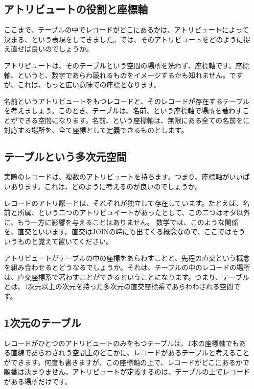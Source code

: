 \subsection{アトリビュートの役割と座標軸}

ここまで、テーブルの中でレコードがどこにあるかは、アトリビュートによって決まる、という表現をしてきました。では、そのアトリビュートをどのように捉え直せば良いのでしょうか。

アトリビュートは、そのテーブルという空間の場所を洗わず、座標軸です。座標軸、というと、数字であらわ競れるものをイメージするかも知れません。ですが、これは、もっと広い意味での座標となります。

名前というアトリビュートをもつレコードと、そのレコードが存在するテーブルを考えましょう。このとき、テーブルは、名前、という座標軸で場所を著わすことができる空間になります。名前、という座標軸は、無限にある全ての名前をに対応する場所を、全て座標として定義できるものとします。

\subsection{テーブルという多次元空間}

実際のレコードは、複数のアトリビュートを持ちます。つまり、座標軸がいいぱいあります。これは、どのように考えるのが良いのでしょうか。

レコードのアトリ謬ーとは、それぞれが独立して存在しています。たとえば、名前と所属、という二つのアトリビュイートがあったとして、この二つはオタ以外に、もう一方に影響を与えることはありません。
数学では、このような関係を、直交といいます。直交はJOINの時にも出てくる概念なので、ここではそういうものと覚えて置いてください。

アトリビュートがテーブルの中の座標をあらわすことと、先程の直交という概念を組み合わせるとどうなるでしょうか。それは、テーブルの中のレコードの場所は、直交座標系で著わすことができるということになります。つまり、テーブルとは、1次元以上の次元を持った多次元の直交座標系であらわわされる空間です。

\subsection{1次元のテーブル}

レコードがひとつのアトリビュートのみをもつテーブルは、1本の座標軸でもある直線であらわされう空間上のどこかに、レコードがあるテーブルと考えることができます。何度も書きますが、この座標軸の上で、レコードがどこにあるかで順番は決まりません。アトリビュートが定義するのは、テーブルの上でレコードがある場所だけです。

